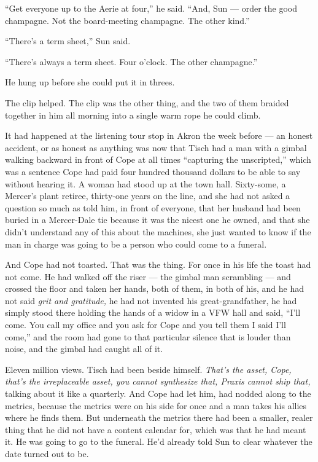 \documentclass[11pt,openany]{book}
\newcommand{\scenebreak}{\par\vspace{0.5\baselineskip}\begin{center}\textasteriskcentered\quad\textasteriskcentered\quad\textasteriskcentered\end{center}\vspace{0.5\baselineskip}\par}
\begin{document}
``Get everyone up to the Aerie at four,'' he said. ``And, Sun --- order the good champagne. Not the board-meeting champagne. The other kind.''

``There's a term sheet,'' Sun said.

``There's always a term sheet. Four o'clock. The other champagne.''

He hung up before she could put it in threes.


\scenebreak


The clip helped. The clip was the other thing, and the two of them braided together in him all morning into a single warm rope he could climb.

It had happened at the listening tour stop in Akron the week before --- an honest accident, or as honest as anything was now that Tisch had a man with a gimbal walking backward in front of Cope at all times ``capturing the unscripted,'' which was a sentence Cope had paid four hundred thousand dollars to be able to say without hearing it. A woman had stood up at the town hall. Sixty-some, a Mercer's plant retiree, thirty-one years on the line, and she had not asked a question so much as told him, in front of everyone, that her husband had been buried in a Mercer-Dale tie because it was the nicest one he owned, and that she didn't understand any of this about the machines, she just wanted to know if the man in charge was going to be a person who could come to a funeral.

And Cope had not toasted. That was the thing. For once in his life the toast had not come. He had walked off the riser --- the gimbal man scrambling --- and crossed the floor and taken her hands, both of them, in both of his, and he had not said \textit{grit and gratitude,} he had not invented his great-grandfather, he had simply stood there holding the hands of a widow in a VFW hall and said, ``I'll come. You call my office and you ask for Cope and you tell them I said I'll come,'' and the room had gone to that particular silence that is louder than noise, and the gimbal had caught all of it.

Eleven million views. Tisch had been beside himself. \textit{That's the asset, Cope, that's the irreplaceable asset, you cannot synthesize that, Praxis cannot ship that,} talking about it like a quarterly. And Cope had let him, had nodded along to the metrics, because the metrics were on his side for once and a man takes his allies where he finds them. But underneath the metrics there had been a smaller, realer thing that he did not have a content calendar for, which was that he had meant it. He was going to go to the funeral. He'd already told Sun to clear whatever the date turned out to be.
\end{document}
